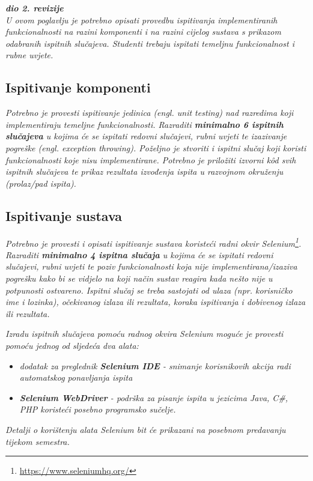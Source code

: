 			\textbf{\textit{dio 2. revizije}}\\
			
			 \textit{U ovom poglavlju je potrebno opisati provedbu ispitivanja implementiranih funkcionalnosti na razini komponenti i na razini cijelog sustava s prikazom odabranih ispitnih slučajeva. Studenti trebaju ispitati temeljnu funkcionalnost i rubne uvjete.}
	
			
			\subsection{Ispitivanje komponenti}
			\textit{Potrebno je provesti ispitivanje jedinica (engl. unit testing) nad razredima koji implementiraju temeljne funkcionalnosti. Razraditi \textbf{minimalno 6 ispitnih slučajeva} u kojima će se ispitati redovni slučajevi, rubni uvjeti te izazivanje pogreške (engl. exception throwing). Poželjno je stvoriti i ispitni slučaj koji koristi funkcionalnosti koje nisu implementirane. Potrebno je priložiti izvorni kôd svih ispitnih slučajeva te prikaz rezultata izvođenja ispita u razvojnom okruženju (prolaz/pad ispita). }
			
			
			
			\subsection{Ispitivanje sustava}
			
			 \textit{Potrebno je provesti i opisati ispitivanje sustava koristeći radni okvir Selenium\footnote{\url{https://www.seleniumhq.org/}}. Razraditi \textbf{minimalno 4 ispitna slučaja} u kojima će se ispitati redovni slučajevi, rubni uvjeti te poziv funkcionalnosti koja nije implementirana/izaziva pogrešku kako bi se vidjelo na koji način sustav reagira kada nešto nije u potpunosti ostvareno. Ispitni slučaj se treba sastojati od ulaza (npr. korisničko ime i lozinka), očekivanog izlaza ili rezultata, koraka ispitivanja i dobivenog izlaza ili rezultata.\\ }
			 
			 \textit{Izradu ispitnih slučajeva pomoću radnog okvira Selenium moguće je provesti pomoću jednog od sljedeća dva alata:}
			 \begin{itemize}
			 	\item \textit{dodatak za preglednik \textbf{Selenium IDE} - snimanje korisnikovih akcija radi automatskog ponavljanja ispita	}
			 	\item \textit{\textbf{Selenium WebDriver} - podrška za pisanje ispita u jezicima Java, C\#, PHP koristeći posebno programsko sučelje.}
			 \end{itemize}
		 	\textit{Detalji o korištenju alata Selenium bit će prikazani na posebnom predavanju tijekom semestra.}
			
